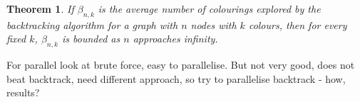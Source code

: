 \documentclass{report}
\theoremstyle{plain}
\newtheorem{theorem}{Theorem}
\theoremstyle{definition}
\theoremstyle{remark}
\numberwithin{definition}{chapter}
\numberwithin{example}{chapter}
\numberwithin{figure}{chapter}
\numberwithin{theorem}{chapter}
\numberwithin{lemma}{chapter}
\begin{document}
\begin{theorem}
If $\beta_{n,k}$ is the average number of colourings explored by the backtracking algorithm for a graph with $n$ nodes with $k$ colours, then for every fixed $k$, $\beta_{n,k}$ is bounded as $n$ approaches infinity.
\end{theorem}

For parallel look at brute force, easy to parallelise. But not very good, does not beat backtrack, need different approach, so try to parallelise backtrack - how, results?



\end{document}
